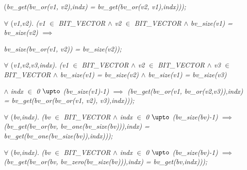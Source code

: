 \hspace*{1.20in}\rm (\it bv\_get\rm (\it bv\_or\rm (\it v1\rm , \it v2\rm )\rm ,\it indx\rm ) \rm = \it bv\_get\rm (\it bv\_or\rm (\it v2\rm , \it v1\rm )\rm ,\it indx\rm )\rm )\rm )\rm ;

\hspace*{0.35in}

\hspace*{0.20in} $\forall$  \rm (\it v1\rm ,\it v2\rm )\rm . \rm (\it v1  $\in$  \it BIT\_VECTOR  $\land$  \it v2  $\in$  \it BIT\_VECTOR  $\land$  \it bv\_size\rm (\it v1\rm ) \rm = \it bv\_size\rm (\it v2\rm )  $\implies$ 

\hspace*{1.00in}\it bv\_size\rm (\it bv\_or\rm (\it v1\rm , \it v2\rm )\rm ) \rm = \it bv\_size\rm (\it v2\rm )\rm )\rm ;\hspace*{0.15in}

\hspace*{0.35in}

\hspace*{0.20in} $\forall$  \rm (\it v1\rm ,\it v2\rm ,\it v3\rm ,\it indx\rm )\rm . \rm (\it v1  $\in$  \it BIT\_VECTOR  $\land$  \it v2  $\in$  \it BIT\_VECTOR $\land$  \it v3  $\in$  \it BIT\_VECTOR  $\land$  \it bv\_size\rm (\it v1\rm ) \rm = \it bv\_size\rm (\it v2\rm )  $\land$  \it bv\_size\rm (\it v1\rm ) \rm = \it bv\_size\rm (\it v3\rm ) 

\hspace*{1.40in} $\land$  \it indx $\in$ \rm 0 $\upto$ \rm (\it bv\_size\rm (\it v1\rm )\rm -\rm 1\rm ) $\implies$  \rm (\it bv\_get\rm (\it bv\_or\rm (\it v1\rm , \it bv\_or\rm (\it v2\rm ,\it v3\rm )\rm )\rm ,\it indx\rm ) \rm = \it bv\_get\rm (\it bv\_or\rm (\it bv\_or\rm (\it v1\rm , \it v2\rm )\rm , \it v3\rm )\rm ,\it indx\rm )\rm )\rm )\rm ;

\hspace*{0.15in}

\hspace*{0.20in} $\forall$  \rm (\it bv\rm ,\it indx\rm )\rm . \rm (\it bv $\in$ \it BIT\_VECTOR  $\land$  \it indx $\in$ \rm 0 $\upto$ \rm (\it bv\_size\rm (\it bv\rm )\rm -\rm 1\rm )  $\implies$  \rm (\it bv\_get\rm (\it bv\_or\rm (\it bv\rm , \it bv\_one\rm (\it bv\_size\rm (\it bv\rm )\rm )\rm )\rm ,\it indx\rm ) \rm = \it bv\_get\rm (\it bv\_one\rm (\it bv\_size\rm (\it bv\rm )\rm )\rm ,\it indx\rm )\rm )\rm )\rm ;

\hspace*{0.20in}

\hspace*{0.20in} $\forall$  \rm (\it bv\rm ,\it indx\rm )\rm . \rm (\it bv $\in$ \it BIT\_VECTOR  $\land$  \it indx $\in$ \rm 0 $\upto$ \rm (\it bv\_size\rm (\it bv\rm )\rm -\rm 1\rm ) $\implies$  \rm (\it bv\_get\rm (\it bv\_or\rm (\it bv\rm , \it bv\_zero\rm (\it bv\_size\rm (\it bv\rm )\rm )\rm )\rm ,\it indx\rm ) \rm = \it bv\_get\rm (\it bv\rm ,\it indx\rm )\rm )\rm )\rm ;

